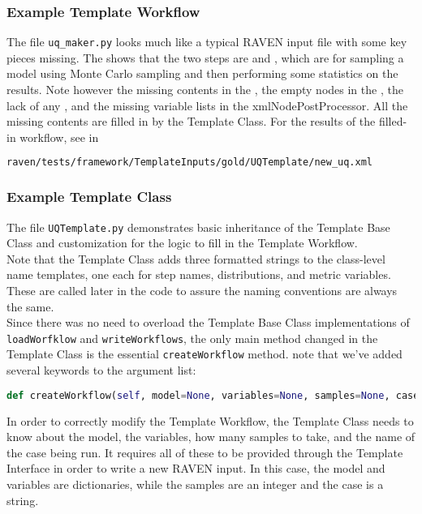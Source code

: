 \subsubsection{Example Template Workflow}
The file \texttt{uq\_maker.py} looks much like a typical RAVEN input file with some key pieces missing. The  shows that the two steps are  and , which are for sampling a model using Monte Carlo sampling and then performing some statistics on the results. Note however the missing contents in the , the empty nodes in the , the lack of any , and the missing variable lists in the xmlNode{PostProcessor}. All the missing contents are filled in by the Template Class. For the results of the filled-in workflow, see in
\begin{lstlisting}[language=bash]
 raven/tests/framework/TemplateInputs/gold/UQTemplate/new_uq.xml
\end{lstlisting}


\subsubsection{Example Template Class}
The file \texttt{UQTemplate.py} demonstrates basic inheritance of the Template Base Class and customization for the logic to fill in the Template Workflow.
\\

Note that the Template Class adds three formatted strings to the class-level name templates, one each for step names, distributions, and metric variables. These are called later in the code to assure the naming conventions are always the same.
\\

Since there was no need to overload the Template Base Class implementations of \texttt{loadWorfklow} and \texttt{writeWorkflows}, the only main method changed in the Template Class is the essential \texttt{createWorkflow} method. note that we've added several keywords to the argument list:
\begin{lstlisting}[language=python]
  def createWorkflow(self, model=None, variables=None, samples=None, case=None, **kwargs):
\end{lstlisting}
In order to correctly modify the Template Workflow, the Template Class needs to know about the model, the variables, how many samples to take, and the name of the case being run. It requires all of these to be provided through the Template Interface in order to write a new RAVEN input. In this case, the model and variables are dictionaries, while the samples are an integer and the case is a string.
\\


